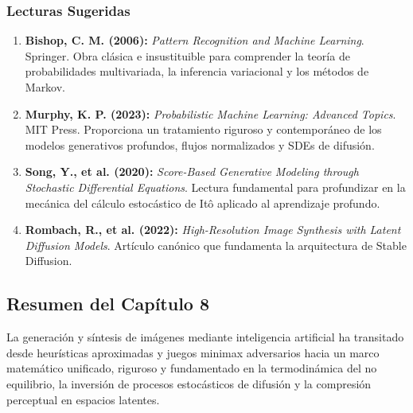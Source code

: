 \vspace{0.3cm}
\subsubsection*{Lecturas Sugeridas}
\begin{enumerate}[leftmargin=1.5em, itemsep=0.15cm]
    \item \textbf{Bishop, C. M. (2006):} \textit{Pattern Recognition and Machine Learning}. Springer. Obra clásica e insustituible para comprender la teoría de probabilidades multivariada, la inferencia variacional y los métodos de Markov.
    \item \textbf{Murphy, K. P. (2023):} \textit{Probabilistic Machine Learning: Advanced Topics}. MIT Press. Proporciona un tratamiento riguroso y contemporáneo de los modelos generativos profundos, flujos normalizados y SDEs de difusión.
    \item \textbf{Song, Y., et al. (2020):} \textit{Score-Based Generative Modeling through Stochastic Differential Equations}. Lectura fundamental para profundizar en la mecánica del cálculo estocástico de Itô aplicado al aprendizaje profundo.
    \item \textbf{Rombach, R., et al. (2022):} \textit{High-Resolution Image Synthesis with Latent Diffusion Models}. Artículo canónico que fundamenta la arquitectura de Stable Diffusion.
\end{enumerate}

\newpage
{}
\subsection*{Resumen del Capítulo 8}

La generación y síntesis de imágenes mediante inteligencia artificial ha transitado desde heurísticas aproximadas y juegos minimax adversarios hacia un marco matemático unificado, riguroso y fundamentado en la termodinámica del no equilibrio, la inversión de procesos estocásticos de difusión y la compresión perceptual en espacios latentes.

\vspace{0.25cm}

